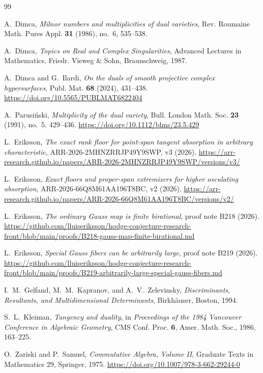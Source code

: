 \documentclass[11pt,a4paper]{article}
\theoremstyle{definition}
\begin{document}
{\small
\begin{thebibliography}{99}

A.~Dimca,
\emph{Milnor numbers and multiplicities of dual varieties},
Rev. Roumaine Math. Pures Appl. \textbf{31} (1986), no.~6, 535--538.

A.~Dimca,
\emph{Topics on Real and Complex Singularities},
Advanced Lectures in Mathematics, Friedr. Vieweg \& Sohn, Braunschweig, 1987.

A.~Dimca and G.~Ilardi,
\emph{On the duals of smooth projective complex hypersurfaces},
Publ. Mat. \textbf{68} (2024), 431--438.
\url{https://doi.org/10.5565/PUBLMAT6822404}

A.~Parusi\'nski,
\emph{Multiplicity of the dual variety},
Bull. London Math. Soc. \textbf{23} (1991), no.~5, 429--436.
\url{https://doi.org/10.1112/blms/23.5.429}

L.~Eriksson,
\emph{The exact rank floor for point-span tangent absorption in arbitrary
characteristic}, ARR-2026-2MHNZRRJP49Y9SWP, v3 (2026).
\url{https://arr-research.github.io/papers/ARR-2026-2MHNZRRJP49Y9SWP/versions/v3/}

L.~Eriksson,
\emph{Exact floors and proper-span extremizers for higher osculating
absorption}, ARR-2026-66Q8M61AA196T8BC, v2 (2026).
\url{https://arr-research.github.io/papers/ARR-2026-66Q8M61AA196T8BC/versions/v2/}

L.~Eriksson,
\emph{The ordinary Gauss map is finite birational}, proof note B218 (2026).
\url{https://github.com/lluiseriksson/hodge-conjecture-research-front/blob/main/proofs/B218-gauss-map-finite-birational.md}

L.~Eriksson,
\emph{Special Gauss fibers can be arbitrarily large}, proof note B219 (2026).
\url{https://github.com/lluiseriksson/hodge-conjecture-research-front/blob/main/proofs/B219-arbitrarily-large-special-gauss-fibers.md}

I.~M.~Gelfand, M.~M.~Kapranov, and A.~V.~Zelevinsky,
\emph{Discriminants, Resultants, and Multidimensional Determinants},
Birkh\"auser, Boston, 1994.

S.~L.~Kleiman,
\emph{Tangency and duality}, in
\emph{Proceedings of the 1984 Vancouver Conference in Algebraic Geometry},
CMS Conf. Proc. \textbf{6}, Amer. Math. Soc., 1986, 163--225.

O.~Zariski and P.~Samuel,
\emph{Commutative Algebra, Volume II},
Graduate Texts in Mathematics 29, Springer, 1975.
\url{https://doi.org/10.1007/978-3-662-29244-0}

\end{thebibliography}
}
\end{document}
